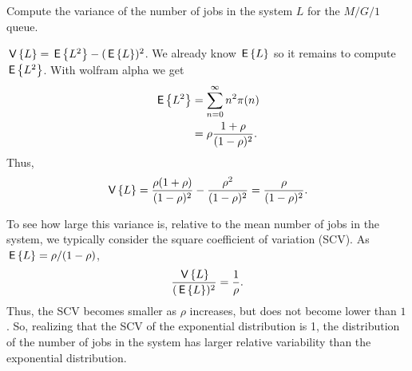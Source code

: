 \begin{question}
  Compute the variance of the number of jobs in the system $L$ for the $M/G/1$ queue.
  \begin{solution}
    $\,\mathsf{V}\left\{L\right\} = \,\mathsf{E}\left\{L^2\right\} - (\,\mathsf{E}\left\{L\right\})^2$. We already know $\,\mathsf{E}\left\{L\right\}$ so it remains
    to compute $\,\mathsf{E}\left\{L^2\right\}$. With wolfram alpha we get
    \begin{equation*}
      \begin{split}
      \,\mathsf{E}\left\{L^2 \right\}
&= \sum_{n=0}^\infty n^2 \pi(n) \\
&= \rho \frac{1+\rho}{(1-\rho)^2}.
      \end{split}
    \end{equation*}
    Thus,
\begin{equation*}
\,\mathsf{V}\left\{L\right\} = \frac{\rho(1+\rho)}{(1-\rho)^2}-\frac{\rho^2}{(1-\rho)^2} = \frac{\rho}{(1-\rho)^2}.
\end{equation*}

To see how large this variance is, relative to the mean number of jobs
in the system, we typically consider the square coefficient of
variation (SCV). As $\,\mathsf{E}\left\{L\right\} = \rho/(1-\rho)$,
\begin{equation*}
  \frac{\,\mathsf{V}\left\{L\right\}}{(\,\mathsf{E}\left\{L\right\})^2} = \frac 1 \rho.
\end{equation*}
Thus, the SCV becomes smaller as $\rho$ increases, but does not become
lower than $1$. So, realizing that the SCV of the exponential
distribution is 1, the distribution of the number of jobs in the
system has larger relative variability than the exponential
distribution.



\end{solution}
\end{question}
